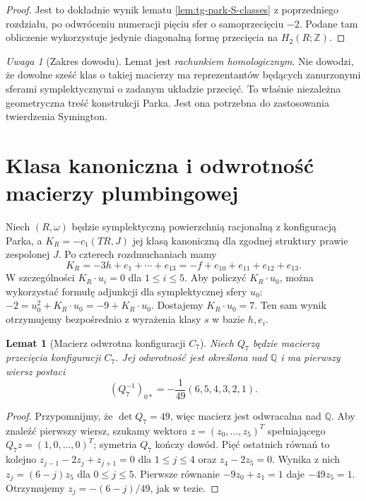 \documentclass[11pt,a4paper]{report}
\numberwithin{equation}{section}
\theoremstyle{plain}
\newtheorem{lemat}[twierdzenie]{Lemat}
\theoremstyle{definition}
\theoremstyle{remark}
\newtheorem{uwaga}[twierdzenie]{Uwaga}
\begin{document}
\begin{proof}
Jest to dokładnie wynik lematu
\ref{lem:tg-park-S-classes} z poprzedniego rozdziału,
po odwróceniu numeracji pięciu sfer o samoprzecięciu $-2$.
Podane tam obliczenie wykorzystuje jedynie diagonalną
formę przecięcia na $H_2(R;\mathbb Z)$.
\end{proof}

\begin{uwaga}[Zakres dowodu]
Lemat jest \emph{rachunkiem homologicznym}.
Nie dowodzi, że dowolne sześć klas o takiej macierzy
ma reprezentantów będących zanurzonymi sferami
symplektycznymi o zadanym układzie przecięć.
To właśnie niezależna geometryczna treść konstrukcji Parka.
Jest ona potrzebna do zastosowania twierdzenia Symington.
\end{uwaga}

\section{Klasa kanoniczna i odwrotność macierzy plumbingowej}
\label{sec:tg-park14-canonical}

Niech $(R,\omega)$ będzie symplektyczną powierzchnią
racjonalną z konfiguracją Parka, a $K_R=-c_1(TR,J)$
jej klasą kanoniczną dla zgodnej struktury prawie
zespolonej $J$. Po czterech rozdmuchaniach mamy
\[
K_R=-3h+e_1+\cdots+e_{13}
    =-f+e_{10}+e_{11}+e_{12}+e_{13}.
\]
W szczególności $K_R\cdot u_i=0$ dla $1\le i\le5$.
Aby policzyć $K_R\cdot u_0$, można wykorzystać
formułę adjunkcji dla symplektycznej sfery $u_0$:
$-2=u_0^2+K_R\cdot u_0=-9+K_R\cdot u_0$.
Dostajemy $K_R\cdot u_0=7$. Ten sam wynik otrzymujemy
bezpośrednio z wyrażenia klasy $s$ w bazie $h,e_i$.

\begin{lemat}[Macierz odwrotna konfiguracji $C_7$]
\label{lem:tg-park14-inverse}
Niech $Q_7$ będzie macierzą przecięcia konfiguracji $C_7$.
Jej odwrotność jest określona nad $\mathbb Q$ i ma pierwszy
wiersz postaci
\[
(Q_7^{-1})_{0*}=-\frac1{49}(6,5,4,3,2,1).
\]
\end{lemat}

\begin{proof}
Przypomnijmy, że $\det Q_7=49$, więc macierz jest
odwracalna nad $\mathbb Q$. Aby znaleźć pierwszy wiersz,
szukamy wektora $z=(z_0,\ldots,z_5)^T$ spełniającego
$Q_7z=(1,0,\ldots,0)^T$; symetria $Q_7$ kończy dowód.
Pięć ostatnich równań to kolejno
$z_{j-1}-2z_j+z_{j+1}=0$ dla $1\le j\le4$
oraz $z_4-2z_5=0$. Wynika z nich
$z_j=(6-j)z_5$ dla $0\le j\le5$.
Pierwsze równanie $-9z_0+z_1=1$ daje
$-49z_5=1$. Otrzymujemy
$z_j=-(6-j)/49$, jak w tezie.
\end{proof}
\end{document}
